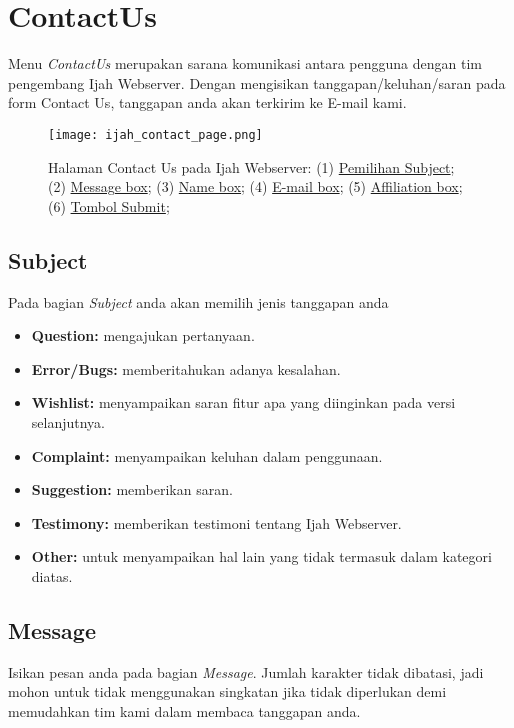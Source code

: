 \section{ContactUs} \label{Contact Us}

Menu \emph{ContactUs} merupakan sarana komunikasi antara pengguna dengan tim pengembang Ijah Webserver. Dengan mengisikan tanggapan/keluhan/saran pada form Contact Us, tanggapan anda akan terkirim ke E-mail kami.

\begin{figure}[H]
	\centering
	\texttt{[image: ijah\_contact\_page.png]}
	\caption{Halaman Contact Us pada Ijah Webserver:
	(1) \hyperref[subject]{Pemilihan Subject};
	(2) \hyperref[message]{Message box};
	(3) \hyperref[personal data]{Name box};
	(4) \hyperref[personal data]{E-mail box};
	(5) \hyperref[personal data]{Affiliation box};
	(6) \hyperref[submit]{Tombol Submit};
	}
	\label{fig:ijah_contact_page}
\end{figure}

	\subsection{Subject} \label{subject}
	Pada bagian \emph{Subject} anda akan memilih jenis tanggapan anda 
	\begin{itemize}
	\item \textbf{Question:} mengajukan pertanyaan.
	\item \textbf{Error/Bugs:} memberitahukan adanya kesalahan.
	\item \textbf{Wishlist:} menyampaikan saran fitur apa yang diinginkan pada versi selanjutnya.
	\item \textbf{Complaint:} menyampaikan keluhan dalam penggunaan.
	\item \textbf{Suggestion:} memberikan saran.
	\item \textbf{Testimony:} memberikan testimoni tentang Ijah Webserver.
	\item \textbf{Other:} untuk menyampaikan hal lain yang tidak termasuk dalam kategori diatas.
	\end{itemize}

	\subsection{Message} \label{message}
	Isikan pesan anda pada bagian \emph{Message}. Jumlah karakter tidak dibatasi, jadi mohon untuk tidak menggunakan singkatan jika tidak diperlukan demi memudahkan tim kami dalam membaca tanggapan anda. 


